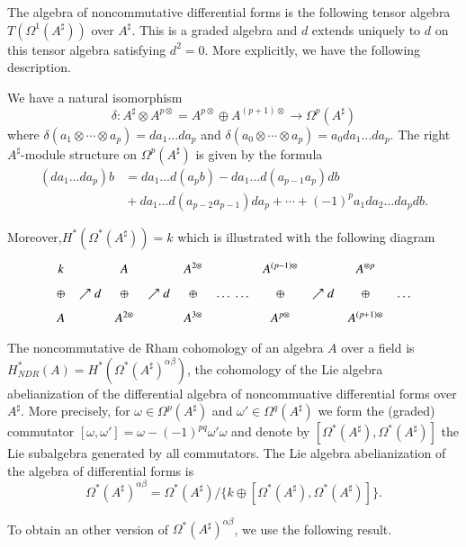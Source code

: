 \begin{definition}\label{chap7-defi2.3}
The algebra of noncommutative differential forms is the following
tensor algebra $T(\Omega^{1}(A^{\sharp}))$ over $A^{\sharp}$. This is
a graded algebra and $d$ extends uniquely to $d$ on this tensor
algebra satisfying $d^{2}=0$. More explicitly, we have the following
description. 
\end{definition}

\begin{proposition}\label{chap7-prop2.4}
We have a natural isomorphism
$$
\delta:A^{\sharp}\otimes A^{p\otimes}=A^{p\otimes}\oplus
A^{(p+1)\otimes}\to \Omega^{p}(A^{\sharp})
$$
where $\delta(a_{1}\otimes\cdots\otimes a_{p})=da_{1}\ldots da_{p}$
and $\delta(a_{0}\otimes\cdots\otimes a_{p})=a_{0}da_{1}\ldots
da_{p}$. The right $A^{\sharp}$-module structure on
$\Omega^{p}(A^{\sharp})$ is given by the formula
\begin{align*}
(da_{1}\ldots da_{p})b &= da_{1}\ldots d(a_{p}b)-da_{1}\ldots
  d(a_{p-1}a_{p})db\\ 
&{} +da_{1}\ldots
  d(a_{p-2}a_{p-1})da_{p}+\cdots+(-1)^{p}a_{1}da_{2}\ldots da_{p}db. 
\end{align*}

Moreover,\pageoriginale $H^{*}(\Omega^{*}(A^{\sharp}))=k$ which is
illustrated with the following diagram
\[
\xymatrix@=.18cm{
k & & A & & A^{2\otimes} & & A^{(p-1)\otimes} & & A^{\otimes p} & \\
\oplus & \nearrow d & \oplus & \nearrow d & \oplus & \ldots\ \ldots &
\oplus & \nearrow d & \oplus & \ldots\\
A & & A^{2\otimes} & & A^{3\otimes} & & A^{p\otimes} & &
A^{(p+1)\otimes} &   
}
\]
\end{proposition}

\begin{definition}\label{chap7-defi2.5}
The noncommutative de Rham cohomology of an algebra $A$ over a field
is $H^{*}_{NDR}(A)=H^{*}(\Omega^{*}(A^{\sharp})^{\alpha\beta})$, the
cohomology of the Lie algebra abelianization of the differential
algebra of noncommuative differential forms over $A^{\sharp}$. More
precisely, for $\omega\in \Omega^{p}(A^{\sharp})$ and $\omega'\in
\Omega^{q}(A^{\sharp})$ we form the (graded) commutator
$[\omega,\omega']=\omega-(-1)^{pq}\omega'\omega$ and denote by
$[\Omega^{*}(A^{\sharp}),\Omega^{*}(A^{\sharp})]$ the Lie subalgebra
generated by all commutators. The Lie algebra abelianization of the
algebra of differential forms is
$$
\Omega^{*}(A^{\sharp})^{\alpha\beta}=\Omega^{*}(A^{\sharp})/\{k\oplus
      [\Omega^{*}(A^{\sharp}), \Omega^{*}(A^{\sharp})]\}.
$$

To obtain an other version of $\Omega^{*}(A^{\sharp})^{\alpha\beta}$,
we use the following result.
\end{definition}

